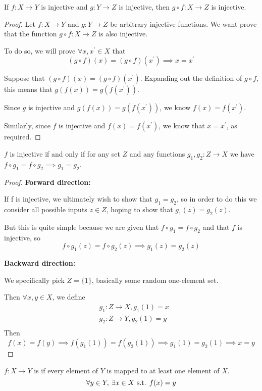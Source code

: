 \begin{proposition}
If $f:X \to Y$ is injective and $g:Y \to Z$ is injective, then $g \circ f:X \to Z$ is injective.
\end{proposition}
\begin{proof}
Let $f:X \to Y$ and $g:Y \to Z$ be arbitrary injective functions. We want prove that the function $g \circ f:X \to Z$ is also injective.

To do so, we will prove $\forall x,x^\prime \in X$ that 
\[ (g \circ f)(x) = (g \circ f)(x^\prime) \implies x=x^\prime \]

Suppose that $(g \circ f)(x) = (g \circ f)(x^\prime)$. Expanding out the definition of $g \circ f$, this means that $g(f(x)) = g(f(x^\prime))$.

Since $g$ is injective and $g(f(x)) = g(f(x^\prime))$, we know $f(x)=f(x^\prime)$.

Similarly, since $f$ is injective and $f(x) = f(x^\prime)$, we know that $x=x^\prime$, as required.
\end{proof}

\begin{proposition}
$f$ is injective if and only if for any set $Z$ and any functions $g_1,g_2:Z\to X$ we have $f\circ g_1=f\circ g_2 \implies g_1=g_2$.
\end{proposition}
\begin{proof}
\textbf{Forward direction:}

If f is injective, we ultimately wish to show that $g_1=g_2$, so in order to do this we consider all possible inputs $z \in Z$, hoping to show that $g_1(z)=g_2(z)$.

But this is quite simple because we are given that $f\circ g_1=f\circ g_2$ and that $f$ is injective, so
\[ f \circ g_1(z)=f \circ g_2(z) \implies g_1(z)=g_2(z) \]

\textbf{Backward direction:}

We specifically pick $Z=\{1\}$, basically some random one-element set.

Then $\forall x,y \in X$, we define
\begin{align*}
& g_1:Z \to X, g_1(1)=x \\
& g_2:Z \to Y, g_2(1)=y \\
\end{align*}
Then
\[ f(x)=f(y) \implies f(g_1(1))=f(g_2(1)) \implies g_1(1)=g_2(1) \implies x=y \]
\end{proof}

\begin{definition}
$f:X\to Y$ is  if every element of $Y$ is mapped to at least one element of $X$.
\[ \forall y\in Y,\:\exists x\in X \text{ s.t. } f(x)=y \]
\end{definition}

